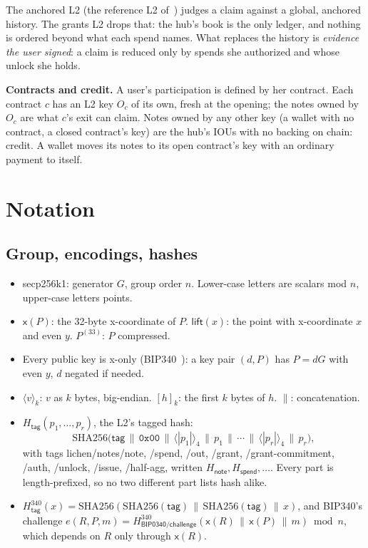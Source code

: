 \documentclass[11pt]{article}
\theoremstyle{plain}
\theoremstyle{definition}
\newcommand{\be}[2]{\langle #1\rangle_{#2}}
\newcommand{\pre}[2]{[#1]_{#2}}
\newcommand{\xo}[1]{\mathsf{x}(#1)}
\newcommand{\Ht}[1]{H_{\textsf{#1}}}
\newcommand{\Hb}[1]{H^{340}_{\textsf{#1}}}
\newcommand{\Oc}{O_c}
\begin{document}
The anchored L2 (the reference L2 of~\cite{lichen}) judges a claim
against a global, anchored history. The grants L2 drops that: the hub's
book is the only ledger, and nothing is ordered beyond what each spend
names. What replaces the history is \emph{evidence the user signed}: a
claim is reduced only by spends she authorized and whose unlock she
holds.

\textbf{Contracts and credit.} A user's participation is defined by her
contract. Each contract $c$ has an L2 key $\Oc$ of its own, fresh at the
opening; the notes owned by $\Oc$ are what $c$'s exit can claim. Notes
owned by any other key (a wallet with no contract, a closed contract's
key) are the hub's IOUs with no backing on chain: credit. A wallet moves
its notes to its open contract's key with an ordinary payment to itself.

\section{Notation}\label{sec:notation}

\subsection{Group, encodings, hashes}

\begin{itemize}[nosep]
\item secp256k1: generator $G$, group order $n$. Lower-case letters are
  scalars mod $n$, upper-case letters points.
\item $\xo{P}$: the 32-byte x-coordinate of $P$. $\mathsf{lift}(x)$: the
  point with x-coordinate $x$ and even $y$. $P^{(33)}$: $P$ compressed.
\item Every public key is x-only (BIP340~\cite{bip340}): a key pair $(d,
  P)$ has $P = dG$ with even $y$, $d$ negated if needed.
\item $\be{v}{k}$: $v$ as $k$ bytes, big-endian. $\pre{h}{k}$: the first
  $k$ bytes of $h$. $\|$: concatenation.
\item $\Ht{tag}(p_1, \dots, p_r)$, the L2's tagged hash:
  \[
    \mathrm{SHA256}\big(\textsf{tag} \,\|\, \texttt{0x00} \,\|\, \be{|p_1|}{4}
    \,\|\, p_1 \,\|\, \cdots \,\|\, \be{|p_r|}{4} \,\|\, p_r\big),
  \]
  with tags \textsf{lichen/notes/note}, \textsf{/spend}, \textsf{/out},
  \textsf{/grant}, \textsf{/grant-commitment}, \textsf{/auth},
  \textsf{/unlock}, \textsf{/issue}, \textsf{/half-agg}, written
  $\Ht{note}, \Ht{spend}, \dots$. Every part is length-prefixed, so no
  two different part lists hash alike.
\item $\Hb{tag}(x) = \mathrm{SHA256}(\mathrm{SHA256}(\textsf{tag}) \,\|\,
  \mathrm{SHA256}(\textsf{tag}) \,\|\, x)$, and BIP340's challenge $e(R,
  P, m) = \Hb{BIP0340/challenge}(\xo{R} \,\|\, \xo{P} \,\|\, m) \bmod n$,
  which depends on $R$ only through $\xo{R}$.
\end{itemize}
\end{document}
